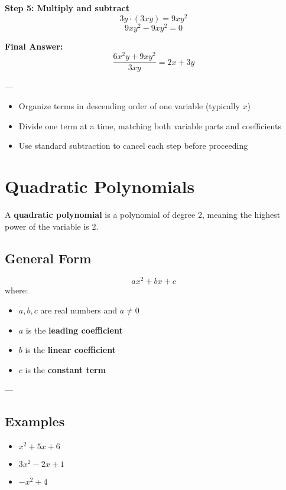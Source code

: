 \documentclass[11pt]{article}
\begin{document}
\textbf{Step 5: Multiply and subtract}
\[
3y \cdot (3xy) = 9xy^2
\]
\[
9xy^2 - 9xy^2 = 0
\]

\textbf{Final Answer:}
\[
\frac{6x^2y + 9xy^2}{3xy} = 2x + 3y
\]

---

\begin{tcolorbox}[title=Tips for Multivariable Long Division, colback=yellow!5!white, colframe=yellow!80!black]
\begin{itemize}
  \item Organize terms in descending order of one variable (typically \( x \))
  \item Divide one term at a time, matching both variable parts and coefficients
  \item Use standard subtraction to cancel each step before proceeding
\end{itemize}
\end{tcolorbox}
\section{Quadratic Polynomials}

A \textbf{quadratic polynomial} is a polynomial of degree 2, meaning the highest power of the variable is 2.

\subsection*{General Form}

\[
ax^2 + bx + c
\]
where:
\begin{itemize}
  \item \( a, b, c \) are real numbers and \( a \ne 0 \)
  \item \( a \) is the \textbf{leading coefficient}
  \item \( b \) is the \textbf{linear coefficient}
  \item \( c \) is the \textbf{constant term}
\end{itemize}

---

\subsection*{Examples}
\begin{itemize}
  \item \( x^2 + 5x + 6 \)
  \item \( 3x^2 - 2x + 1 \)
  \item \( -x^2 + 4 \)
\end{itemize}
\end{document}
